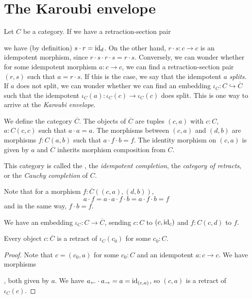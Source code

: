 \section{The Karoubi envelope}
Let $ C $ be a category. If we have a retraction-section pair
we have (by definition) $ s \cdot r = \text{id}_{d} $. On the other hand, $ r \cdot s: c \to c $ is an idempotent morphism, since $ r \cdot s \cdot r \cdot s = r \cdot s $. Conversely, we can wonder whether for some idempotent morphism $ a: c \to c $, we can find a retraction-section pair $ (r, s) $ such that $ a = r \cdot s $. If this is the case, we say that the idempotent $ a $ \textit{splits}. If $ a $ does not split, we can wonder whether we can find an embedding $ \iota_C : C \hookrightarrow \overline C $ such that the idempotent $ \iota_C(a): \iota_C(c) \to \iota_C(c) $ does split. This is one way to arrive at the \textit{Karoubi envelope}.

\begin{definition}
  We define the category $ \overline C $. The objects of $ \overline C $ are tuples $ (c, a) $ with $ c: C $, $ a: C(c, c) $ such that $ a \cdot a = a $. The morphisms between $ (c, a) $ and $ (d, b) $ are morphisms $ f: C(a, b) $ such that $ a \cdot f \cdot b = f $. The identity morphism on $ (c, a) $ is given by $ a $ and $ \overline C $ inherits morphism composition from $ C $.
\end{definition}
This category is called the , the \textit{idempotent completion}, the \textit{category of retracts}, or the \textit{Cauchy completion} of $ C $.

\begin{remark}
  Note that for a morphism $ f: \overline C((c, a), (d, b)) $,
  \[ a \cdot f = a \cdot a \cdot f \cdot b = a \cdot f \cdot b = f \]
  and in the same way, $ f \cdot b = f $.
\end{remark}

\begin{definition}
  We have an embedding $ \iota_C: C \to \overline C $, sending $ c: C $ to $ (c, \text{id}_{c}) $ and $ f: C(c, d) $ to $ f $.
\end{definition}

\begin{lemma}
  Every object $ c: \overline C $ is a retract of $ \iota_C(c_0) $ for some $ c_0: C $.
\end{lemma}
\begin{proof}
  Note that $ c = (c_0, a) $ for some $ c_0: C $ and an idempotent $ a: c \to c $. We have morphisms
  , both given by $ a $. We have $ a_\leftarrow \cdot a_\rightarrow = a = \text{id}_{(c, a)} $, so $ (c, a) $ is a retract of $ \iota_C(c) $.
\end{proof}


